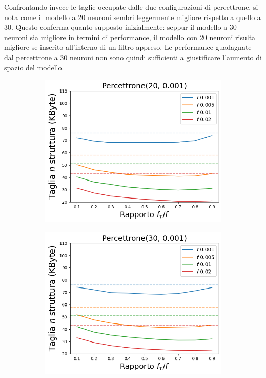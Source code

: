 \documentclass[../../main.tex]{subfiles}
\begin{document}
    Confrontando invece le taglie occupate dalle due configurazioni di percettrone, si nota come il modello a 20 neuroni sembri leggermente migliore rispetto a quello a 30. Questo conferma quanto supposto inizialmente: seppur il modello a 30 neuroni sia migliore in termini di performance, il modello con 20 neuroni risulta migliore se inserito all'interno di un filtro appreso. Le performance guadagnate dal percettrone a 30 neuroni non sono quindi sufficienti a giustificare l'aumento di spazio del modello.

    \begin{figure}[H]
        \centering
        \begin{subfigure}[b]{0.49\textwidth}
            \centering
            \includegraphics[width = \textwidth]{immagini/7/LBF/Percettrone(20, 0.001)_Taglia.png}
            \caption{}
            \label{fig:LBFTagliaPercettrone20}
        \end{subfigure}
        \begin{subfigure}[b]{0.49\textwidth}
            \centering
            \includegraphics[width = \textwidth]{immagini/7/LBF/Percettrone(30, 0.001)_Taglia.png}

\end{subfigure}
\end{figure}
\end{document}
